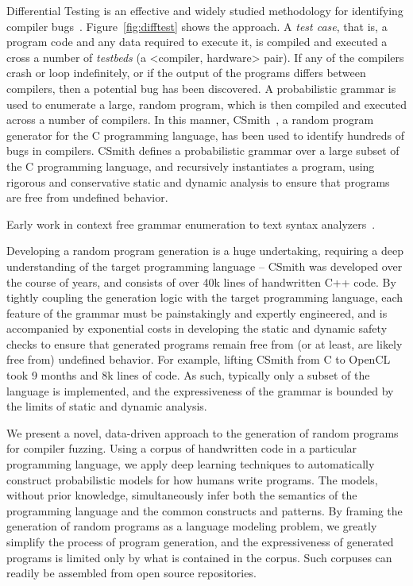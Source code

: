 Differential Testing is an effective and widely studied methodology for identifying compiler bugs~\cite{Chen2014a,Kossatchev2005,Chen2013}. Figure~\ref{fig:difftest} shows the approach. A \emph{test case}, that is, a program code and any data required to execute it, is compiled and executed a cross a number of \emph{testbeds} (a <compiler, hardware> pair). If any of the compilers crash or loop indefinitely, or if the output of the programs differs between compilers, then a potential bug has been discovered. A probabilistic grammar is used to enumerate a large, random program, which is then compiled and executed across a number of compilers. In this manner, CSmith~\cite{Yang2011}, a random program generator for the C programming language, has been used to identify hundreds of bugs in compilers. CSmith defines a probabilistic grammar over a large subset of the C programming language, and recursively instantiates a program, using rigorous and conservative static and dynamic analysis to ensure that programs are free from undefined behavior.

Early work in context free grammar enumeration to text syntax analyzers~\cite{Malloy2001}.

Developing a random program generation is a huge undertaking, requiring a deep understanding of the target programming language -- CSmith was developed over the course of years, and consists of over 40k lines of handwritten C++ code. By tightly coupling the generation logic with the target programming language, each feature of the grammar must be painstakingly and expertly engineered, and is accompanied by exponential costs in developing the static and dynamic safety checks to ensure that generated programs remain free from (or at least, are likely free from) undefined behavior. For example, lifting CSmith from C to OpenCL~\cite{Lidbury2015a} took 9 months and 8k lines of code. As such, typically only a subset of the language is implemented, and the expressiveness of the grammar is bounded by the limits of static and dynamic analysis.

We present a novel, data-driven approach to the generation of random programs for compiler fuzzing. Using a corpus of handwritten code in a particular programming language, we apply deep learning techniques to automatically construct probabilistic models for how humans write programs. The models, without prior knowledge, simultaneously infer both the semantics of the programming language and the common constructs and patterns. By framing the generation of random programs as a language modeling problem, we greatly simplify the process of program generation, and the expressiveness of generated programs is limited only by what is contained in the corpus. Such corpuses can readily be assembled from open source repositories.

